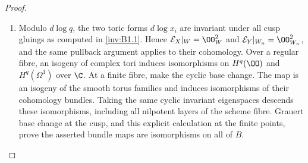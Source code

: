 \begin{proof}
\begin{enumerate}[label=\arabic*.,leftmargin=*]
\item Modulo $d\log q$, the two toric forms $d\log x_i$ are invariant
under all cusp gluings as computed in \ref{inv:B1.1}. Hence
$\mathcal E_X|_W=\OO_W^2$ and $\mathcal E_Y|_{W_n}=\OO_{W_n}^2$,
and the same pullback argument applies to their cohomology.
Over a regular fibre, an isogeny of complex tori induces isomorphisms
on $H^q(\OO)$ and $H^q(\Omega^1)$ over $\C$.
At a finite fibre, make the cyclic base change. The map is an isogeny
of the smooth torus families and induces isomorphisms of their
cohomology bundles. Taking the same cyclic invariant eigenspaces
descends these isomorphisms, including all nilpotent layers of the
scheme fibre. Grauert base change at the cusp, and this explicit
calculation at the finite points, prove the asserted bundle maps are
isomorphisms on all of $B$.
\end{enumerate}
\end{proof}